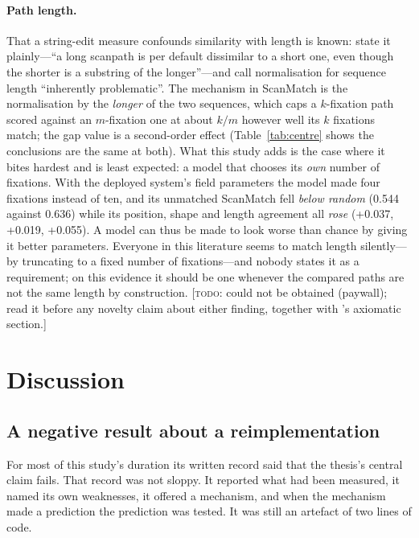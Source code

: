 \documentclass[11pt,a4paper]{article}
\newcommand{\todo}[1]{\textcolor{red!70!black}{[\textsc{todo:} #1]}}
\newcommand{\todo}[1]{}
\begin{document}
\paragraph{Path length.} That a string-edit measure confounds similarity with
length is known: \citet{jarodzka2010} state it plainly---``a long scanpath is per
default dissimilar to a short one, even though the shorter is a substring of the
longer''---and \citet{mathot2012} call normalisation for sequence length
``inherently problematic''. The mechanism in ScanMatch is the normalisation by
the \emph{longer} of the two sequences, which caps a $k$-fixation path scored
against an $m$-fixation one at about $k/m$ however well its $k$ fixations match;
the gap value is a second-order effect (Table~\ref{tab:centre} shows the
conclusions are the same at both). What this study adds is the case where it
bites hardest and is least expected: a model that chooses its \emph{own} number
of fixations. With the deployed system's field parameters the model made four
fixations instead of ten, and its unmatched ScanMatch fell \emph{below random}
(0.544 against 0.636) while its position, shape and length agreement all
\emph{rose} (+0.037, +0.019, +0.055). A model can thus be made to look worse
than chance by giving it better parameters. Everyone in this literature seems to
match length silently---by truncating to a fixed number of fixations---and
nobody states it as a requirement; on this evidence it should be one whenever
the compared paths are not the same length by construction.
\todo{\citet{fahimi2021} could not be obtained (paywall); read it before any
novelty claim about either finding, together with \citet{anderson2015}'s
axiomatic section.}

\section{Discussion}
\label{sec:discussion}

\subsection{A negative result about a reimplementation}
For most of this study's duration its written record said that the thesis's
central claim fails. That record was not sloppy. It reported what had been
measured, it named its own weaknesses, it offered a mechanism, and when the
mechanism made a prediction the prediction was tested. It was still an artefact
of two lines of code.
\end{document}
